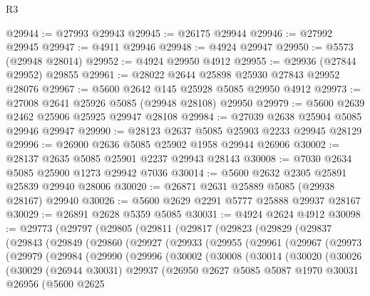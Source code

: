 \begin{lexlean}{R3}
\begin{coremodule}
@29944 := @27993 @29943
@29945 := @26175 @29944
@29946 := @27992 @29945
@29947 := @4911 @29946
@29948 := @4924 @29947
@29950 := @5573 (@29948 @28014)
@29952 := @4924 @29950 @4912
@29955 := @29936 (@27844 @29952) @29855
@29961 := @28022 @2644 @25898 @25930 @27843 @29952 @28076
@29967 := @5600 @2642 @145 @25928 @5085 @29950 @4912
@29973 := @27008 @2641 @25926 @5085 (@29948 @28108) @29950
@29979 := @5600 @2639 @2462 @25906 @25925 @29947 @28108
@29984 := @27039 @2638 @25904 @5085 @29946 @29947
@29990 := @28123 @2637 @5085 @25903 @2233 @29945 @28129
@29996 := @26900 @2636 @5085 @25902 @1958 @29944 @26906
@30002 := @28137 @2635 @5085 @25901 @2237 @29943 @28143
@30008 := @7030 @2634 @5085 @25900 @1273 @29942 @7036
@30014 := @5600 @2632 @2305 @25891 @25839 @29940 @28006
@30020 := @26871 @2631 @25889 @5085 (@29938 @28167) @29940
@30026 := @5600 @2629 @2291 @5777 @25888 @29937 @28167
@30029 := @26891 @2628 @5359 @5085
@30031 := @4924 @2624 @4912
@30098 := @29773
    (@29797
      (@29805
        (@29811
          (@29817
            (@29823
              (@29829
                (@29837
                  (@29843
                    (@29849
                      (@29860
                        (@29927
                          (@29933
                            (@29955
                              (@29961
                                (@29967
                                  (@29973
                                    (@29979
                                      (@29984
                                        (@29990
                                          (@29996
                                            (@30002
                                              (@30008
                                                (@30014
                                                  (@30020
                                                    (@30026
                                                      (@30029
                                                        (@26944 @30031)
                                                        @29937
                                                        (@26950
                                                          @2627
                                                          @5085
                                                          @5087
                                                          @1970
                                                          @30031
                                                          @26956
                                                          (@5600
                                                            @2625

\end{coremodule}
\end{lexlean}
